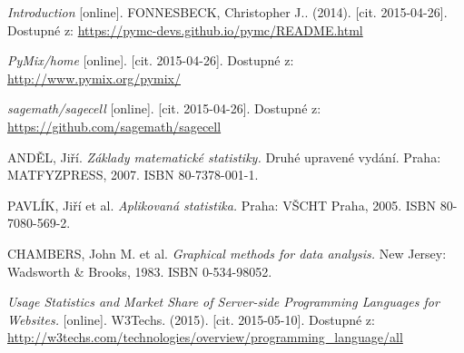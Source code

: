 \documentclass[thesis=B,czech]{FITthesis}[2012/06/26]
\begin{document}
\begin{thebibliography}{Per00}
\emph{Introduction} [online]. FONNESBECK, Christopher J.. (2014). [cit. 2015-04-26]. Dostupné z: \url{https://pymc-devs.github.io/pymc/README.html}

\emph{PyMix/home} [online]. [cit. 2015-04-26]. Dostupné z: \url{http://www.pymix.org/pymix/}

\emph{sagemath/sagecell} [online]. [cit. 2015-04-26]. Dostupné z: \url{https://github.com/sagemath/sagecell}

ANDĚL, Jiří. \emph{Základy matematické statistiky.} Druhé upravené vydání. Praha: MATFYZPRESS, 2007. ISBN 80-7378-001-1.

PAVLÍK, Jiří et al. \emph{Aplikovaná statistika.} Praha: VŠCHT Praha, 2005. ISBN 80-7080-569-2.

CHAMBERS, John M. et al. \emph{Graphical methods for data analysis.} New Jersey: Wadsworth \& Brooks, 1983. ISBN 0-534-98052.

\emph{Usage Statistics and Market Share of Server-side Programming Languages for Websites.} [online]. W3Techs. (2015). [cit. 2015-05-10]. Dostupné z: \url{http://w3techs.com/technologies/overview/programming\_language/all}

\end{thebibliography}
\end{document}
